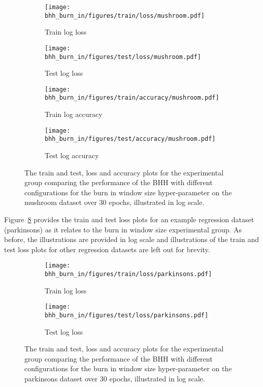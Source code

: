 \begin{figure}[htb]
	\begin{subfigure}{0.5\textwidth}
		\centering
		\texttt{[image: bhh\_burn\_in/figures/train/loss/mushroom.pdf]}
		\caption{Train log loss}
		\label{fig:results:burn_in:figures:loss:train:mushroom}
	\end{subfigure}
	\begin{subfigure}{0.5\textwidth}
		\centering
		\texttt{[image: bhh\_burn\_in/figures/test/loss/mushroom.pdf]}
		\caption{Test log loss}
		\label{fig:results:burn_in:figures:loss:test:mushroom}
	\end{subfigure}
	\par\bigskip
	\begin{subfigure}{0.5\textwidth}
		\centering
		\texttt{[image: bhh\_burn\_in/figures/train/accuracy/mushroom.pdf]}
		\caption{Train log accuracy}
		\label{fig:results:burn_in:figures:accuracy:train:mushroom}
	\end{subfigure}
	\begin{subfigure}{0.5\textwidth}
		\centering
		\texttt{[image: bhh\_burn\_in/figures/test/accuracy/mushroom.pdf]}
		\caption{Test log accuracy}
		\label{fig:results:burn_in:figures:accuracy:test:mushroom}
	\end{subfigure}
	\par\bigskip
	\caption{The train and test, loss and accuracy plots for the experimental group comparing the performance of the \acs{BHH} with different configurations for the burn in window size hyper-parameter on the mushroom dataset over 30 epochs, illustrated in log scale.}
	\label{fig:results:burn_in:figures:mushroom}
\end{figure}

Figure~\ref{fig:results:burn_in:figures:parkinsons} provides the train and test loss plots for an example regression dataset (parkinsons) as it relates to the burn in window size experimental group. As before, the illustrations are provided in log scale and illustrations of the train and test loss plots for other regression datasets are left out for brevity.

\begin{figure}[htb]
	\begin{subfigure}{0.5\textwidth}
		\centering
		\texttt{[image: bhh\_burn\_in/figures/train/loss/parkinsons.pdf]}
		\caption{Train log loss}
		\label{fig:results:burn_in:figures:loss:train:parkinsons}
	\end{subfigure}
	\begin{subfigure}{0.5\textwidth}
		\centering
		\texttt{[image: bhh\_burn\_in/figures/test/loss/parkinsons.pdf]}
		\caption{Test log loss}
		\label{fig:results:burn_in:figures:loss:test:parkinsons}
	\end{subfigure}
	\par\bigskip
	\caption{The train and test, loss and accuracy plots for the experimental group comparing the performance of the \acs{BHH} with different configurations for the burn in window size hyper-parameter on the parkinsons dataset over 30 epochs, illustrated in log scale.}
	\label{fig:results:burn_in:figures:parkinsons}
\end{figure}

